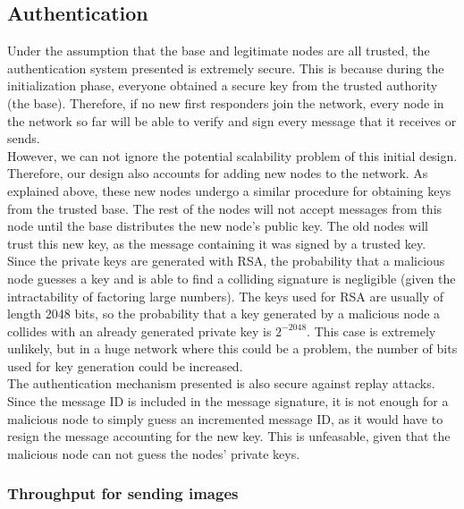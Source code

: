 \documentclass[letterpaper]{article}
\begin{document}
\subsection{Authentication}
Under the assumption that the base and legitimate nodes are all trusted, the authentication system presented is extremely secure. This is because during the initialization phase, everyone obtained a secure key from the trusted authority (the base). Therefore, if no new first responders join the network, every node in the network so far will be able to verify and sign every message that it receives or sends. \\

\noindent However, we can not ignore the potential scalability problem of this initial design. Therefore, our design also accounts for adding new nodes to the network. As explained above, these new nodes undergo a similar procedure for obtaining keys from the trusted base. The rest of the nodes will not accept messages from this node until the base distributes the new node's public key. The old nodes will trust this new key, as the message containing it was signed by a trusted key.
\\

\noindent Since the private keys are generated with RSA, the probability that a malicious node guesses a key and is able to find a colliding signature is negligible (given the intractability of factoring large numbers). The keys used for RSA are usually of length 2048 bits, so the probability that a key generated by a malicious node a collides with an already generated private key is $2^{-2048}$. This case is extremely unlikely, but in a huge network where this could be a problem, the number of bits used for key generation could be increased.\\

\noindent The authentication mechanism presented is also secure against replay attacks. Since the message ID is included in the message signature, it is not enough for a malicious node to simply guess an incremented message ID, as it would have to resign the message accounting for the new key. This is unfeasable, given that the malicious node can not guess the nodes' private keys.

\subsubsection{Throughput for sending images}
\end{document}

